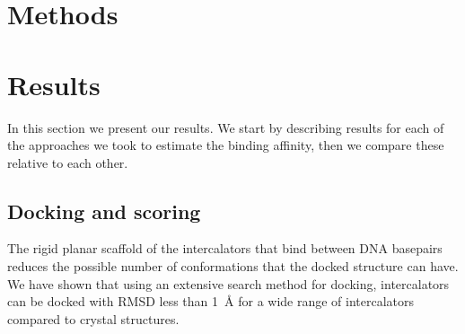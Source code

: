 \documentclass{article}
\begin{document}
\section{Methods}







\section{Results}




In this section we present our results. We start by describing results for each of the approaches we took to estimate the binding affinity, then we compare these relative to each other.


\subsection{Docking and scoring}




The rigid planar scaffold of the intercalators that bind between DNA basepairs reduces the possible number of conformations that the docked structure can have. We have shown that using an extensive search method for docking, intercalators can be docked with RMSD less than \SI{1}{\angstrom} for a wide range of intercalators compared to crystal structures.
\end{document}
